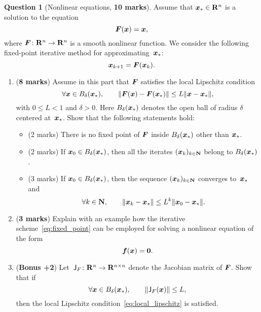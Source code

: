 \documentclass[11pt]{article}
\theoremstyle{definition}
\newtheorem{question}{Question}
\begin{document}
\newpage
\begin{question}
    [Nonlinear equations, \textbf{10 marks}]
    Assume that $\mathbf{\boldsymbol{x}}_* \in \mathbf R^n$ is a solution to the equation
    \[
        \mathbf{\boldsymbol{F}}(\mathbf{\boldsymbol{x}}) = \mathbf{\boldsymbol{x}},
    \]
    where $\mathbf{\boldsymbol{F}}\colon \mathbf R^n \to \mathbf R^n$ is a smooth nonlinear function.
    We consider the following fixed-point iterative method for approximating~$\mathbf{\boldsymbol{x}}_*$:
    \begin{equation}
        \label{eq:fixed_point}
        \mathbf{\boldsymbol{x}}_{k+1} = \mathbf{\boldsymbol{F}}(\mathbf{\boldsymbol{x}}_k).
    \end{equation}
    \begin{enumerate}
        \item
            (\textbf{8 marks})
            Assume in this part that $\mathbf{\boldsymbol{F}}$ satisfies the local Lipschitz condition
            \begin{equation}
                \label{eq:local_lipschitz}
                \forall \vect x \in B_{\delta}(\vect x_*), \qquad
                \norm[big]{\vect F(\vect x) - \vect F(\vect x_*)} \leq L \norm{\vect x - \vect x_*},
            \end{equation}
            with $0 \leq L < 1$ and $\delta > 0$.
            Here $B_{\delta}(\mathbf{\boldsymbol{x}}_*)$ denotes the open ball of radius $\delta$ centered at~$\mathbf{\boldsymbol{x}}_*$.
            Show that the following statements hold:
            \begin{itemize}
                \item (2 marks) There is no fixed point of $\mathbf{\boldsymbol{F}}$ inside $B_{\delta}(\mathbf{\boldsymbol{x}}_*)$ other than $\mathbf{\boldsymbol{x}}_*$.
                \item (2 marks) If $\mathbf{\boldsymbol{x}}_0 \in B_{\delta}(\mathbf{\boldsymbol{x}}_*)$, then all the iterates $(\mathbf{\boldsymbol{x}}_k)_{k \in \mathbf N}$ belong to $B_{\delta}(\mathbf{\boldsymbol{x}}_*)$.
                \item (3 marks) If $\mathbf{\boldsymbol{x}}_0 \in B_{\delta}(\mathbf{\boldsymbol{x}}_*)$, then the sequence $(\mathbf{\boldsymbol{x}}_k)_{k \in \mathbf N}$ converges to~$\mathbf{\boldsymbol{x}}_*$ and
                    \[
                        \forall k \in \mathbf N, \qquad
                        \lVert\mathbf{\boldsymbol{x}}_k - \mathbf{\boldsymbol{x}}_*\rVert \leq L^k \lVert\mathbf{\boldsymbol{x}}_0 - \mathbf{\boldsymbol{x}}_*\rVert.
                    \]
            \end{itemize}

        \item
            (\textbf{3 marks})
            Explain with an example how the iterative scheme~\eqref{eq:fixed_point} can be employed for solving a nonlinear equation of the form
            \[
                \mathbf{\boldsymbol{f}}(\mathbf{\boldsymbol{x}}) = \mathbf{\boldsymbol{0}}.
            \]

        \item
            (\textbf{Bonus +2})
            Let~$\mathsf J_F\colon \mathbf R^n \to \mathbf R^{n\times n}$ denote the Jacobian matrix of $\mathbf{\boldsymbol{F}}$.
            Show that if
            \begin{equation*}
                \forall \vect x \in B_{\delta}(\vect x_*), \qquad
                \norm[big]{\mat J_F(\vect x)} \leq L,
            \end{equation*}
            then the local Lipschitz condition~\eqref{eq:local_lipschitz} is satisfied.
    \end{enumerate}
\end{question}
\end{document}
